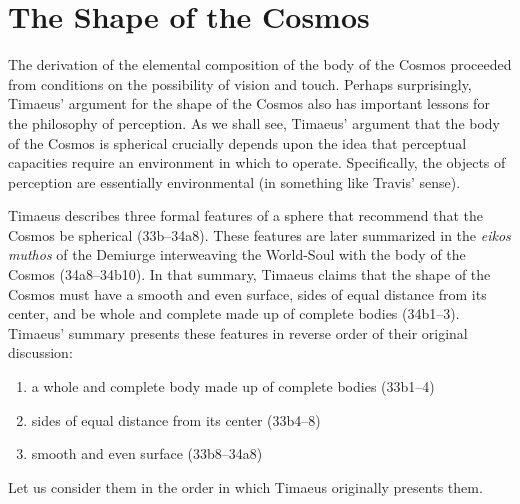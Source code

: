 
\section{The Shape of the Cosmos} %
\label{sec:the_shape_of_the_Cosmos}

The derivation of the elemental composition of the body of the Cosmos proceeded from conditions on the possibility of vision and touch. Perhaps surprisingly, Timaeus' argument for the shape of the Cosmos also has important lessons for the philosophy of perception. As we shall see, Timaeus' argument that the body of the Cosmos is spherical crucially depends upon the idea that perceptual capacities require an environment in which to operate. Specifically, the objects of perception are essentially environmental (in something like Travis' \citeyear{Travis:2005ys} sense). 

Timaeus describes three formal features of a sphere that recommend that the Cosmos be spherical (33b--34a8). These features are later summarized in the \emph{eikos muthos} of the Demiurge interweaving the World-Soul with the body of the Cosmos (34a8--34b10). In that summary, Timaeus claims that the shape of the Cosmos must have a smooth and even surface, sides of equal distance from its center, and be whole and complete made up of complete bodies (34b1--3). Timaeus' summary presents these features in reverse order of their original discussion:
\begin{enumerate}[(1)]
	\item a whole and complete body made up of complete bodies (33b1--4)
	\item sides of equal distance from its center (33b4--8)
	\item smooth and even surface (33b8--34a8)
\end{enumerate}
Let us consider them in the order in which Timaeus originally presents them.

